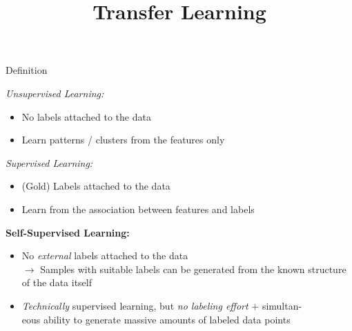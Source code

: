 



\newcommand{\titlefigure}{figure/selfsup.jpg}
\newcommand{\learninggoals}{
\item Understand the difference to other learning paradigms
\item Learn to recognize self-supervision when you see it}

\title{Transfer Learning}
\date{}




\begin{frame}{Definition}

	\vfill 
	
	\textit{Unsupervised Learning:}

	\begin{itemize}
		\item No labels attached to the data
		\item Learn patterns / clusters from the features only
	\end{itemize}
	
	\textit{Supervised Learning:}

	\begin{itemize}
		\item (Gold) Labels attached to the data
		\item Learn from the association between features and labels
	\end{itemize}
	
	\textbf{Self-Supervised Learning:}

	\begin{itemize}
		\item No \textit{external} labels attached to the data\\
					$\to$ Samples with suitable labels can be generated from the known structure of the data itself 
		\item \textit{Technically} supervised learning, but \textit{no labeling effort} $+$ simultan-\\eous ability to generate massive amounts of labeled data points
	\end{itemize}
	
	\vfill 
	
\end{frame}


